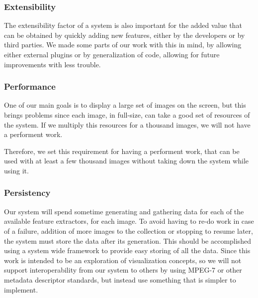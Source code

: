 


\subsubsection{Extensibility} %
\label{reqs:Extensibility}

The extensibility factor of a system is also important for the added value that can be obtained by quickly adding new features, either by the developers or by third parties. We made some parts of our work with this in mind, by allowing either external plugins or by generalization of code, allowing for future improvements with less trouble.




\subsubsection{Performance} %
\label{reqs:Performance}

One of our main goals is to display a large set of images on the screen, but this brings problems since each image, in full-size, can take a good set of resources of the system. If we multiply this resources for a thousand images, we will not have a performent work.

Therefore, we set this requirement for having a performent work, that can be used with at least a few thousand images without taking down the system while using it.




\subsubsection{Persistency}

Our system will spend sometime generating and gathering data for each of the available feature extractors, for each image. To avoid having to re-do work in case of a failure, addition of more images to the collection or stopping to resume later, the system must store the data after its generation. This should be accomplished using a system wide framework to provide easy storing of all the data. Since this work is intended to be an exploration of visualization concepts, so we will not support interoperability from our system to others by using MPEG-7 or other metadata descriptor standards, but instead use something that is simpler to implement.


